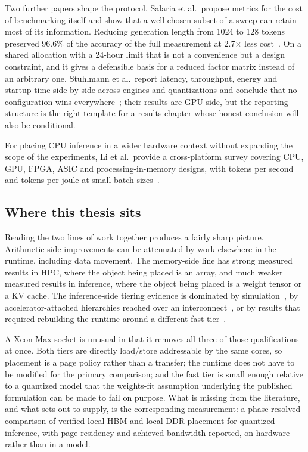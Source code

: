 Two further papers shape the protocol.  Salaria et al.\ propose metrics
for the cost of benchmarking itself and show that a well-chosen subset
of a sweep can retain most of its information.  Reducing generation
length from 1024 to 128 tokens preserved 96.6\% of the accuracy of the
full measurement at 2.7$\times$ less cost~\cite{salaria2025metametrics}.
On a shared allocation with a 24-hour limit that is not a convenience
but a design constraint, and it gives a defensible basis for a reduced
factor matrix instead of an arbitrary one.  Stuhlmann et al.\ report
latency, throughput, energy and startup time side by side across
engines and quantizations and conclude that no configuration wins
everywhere~\cite{stuhlmann2025bench360}; their results are GPU-side, but
the reporting structure is the right template for a results chapter
whose honest conclusion will also be conditional.

For placing CPU inference in a wider hardware context without expanding
the scope of the experiments, Li et al.\ provide a cross-platform survey
covering CPU, GPU, FPGA, ASIC and processing-in-memory designs, with
tokens per second and tokens per joule at small batch
sizes~\cite{li2024hardwareperspective}.

\subsection{Where this thesis sits}
\label{sec:lit-position}

Reading the two lines of work together produces a fairly sharp picture.
Arithmetic-side improvements can be attenuated by work elsewhere in the
runtime, including data movement.  The memory-side line has strong measured results in HPC,
where the object being placed is an array, and much weaker measured
results in inference, where the object being placed is a weight tensor
or a KV cache.  The inference-side tiering evidence is dominated by
simulation~\cite{fang2025kvplacement}, by accelerator-attached
hierarchies reached over an interconnect~\cite{jang2026itme,jang2026hymcache},
or by results that required rebuilding the runtime around a different
fast tier~\cite{zhang2026cacheresident}.

A Xeon Max socket is unusual in that it removes all three of those
qualifications at once.  Both tiers are directly load/store addressable
by the same cores, so placement is a page policy rather than a transfer;
the runtime does not have to be modified for the primary comparison; and
the fast tier is small enough relative to a quantized model that the
weights-fit assumption underlying the published formulation can be made
to fail on purpose.  What is missing from the literature, and what
 sets out to supply, is the corresponding
measurement: a phase-resolved comparison of verified local-HBM and
local-DDR placement for quantized \lcpp{} inference, with page residency
and achieved bandwidth reported, on hardware rather than in a model.

